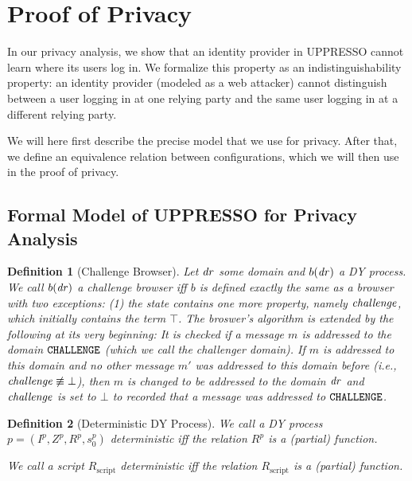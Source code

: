 \documentclass[letterpaper,onecolumn,10pt]{article}
\newtheorem{definition}{Definition}
\begin{document}
\section{Proof of Privacy}

In our privacy analysis, we show that an identity provider in UPPRESSO cannot learn 
where its users log in. We formalize this property as an indistinguishability 
property: an identity provider (modeled as a web attacker) cannot distinguish 
between a user logging in at one relying party and the same user logging in at 
a different relying party.

We will here first describe the precise model that we use for privacy.
After that, we define an equivalence relation between configurations,
which we will then use in the proof of privacy.

\subsection{Formal Model of UPPRESSO for Privacy Analysis}

\begin{definition}[Challenge Browser]
  Let $\mathit{dr}$ some domain and $b(\mathit{dr})$ a DY process. We call $b(\mathit{dr})$ a \emph{challenge browser} iff $b$
  is defined exactly the same as a browser with two exceptions: (1) the
  state contains one more property, namely $\mathit{challenge}$, which  initially 
  contains the term $\top$. The broswer's algorithm is extended by the following 
  at its very beginning: It is checked if a message $m$ is addressed to the domain
  $\mathtt{CHALLENGE}$ (which we call the challenger domain). If $m$ is
  addressed to this domain and no other message $m'$ was addressed to
  this domain before (i.e., $\mathit{challenge} \not\equiv \bot$), then
  $m$ is changed to be addressed to the domain $\mathit{dr}$ and $\mathit{challenge}$ is 
  set to $\bot$ to recorded that a message was addressed to $\mathtt{CHALLENGE}$.
\end{definition}

\begin{definition}[Deterministic DY Process]
  We call a DY process $p = (I^p,Z^p,R^p,s_0^p)$ \emph{deterministic} iff 
  the relation $R^p$ is a (partial) function.

  We call a script $R_\text{script}$ \emph{deterministic} iff the relation 
  $R_\text{script}$ is a (partial) function.
\end{definition}
\end{document}
